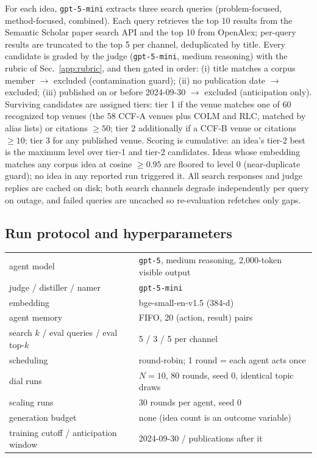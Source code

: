 \documentclass{article} %
\begin{document}
For each idea, \texttt{gpt-5-mini} extracts three search queries
(problem-focused, method-focused, combined). Each query retrieves the
top 10 results from the Semantic Scholar paper search API and the top
10 from OpenAlex; per-query results are truncated to the top 5 per
channel, deduplicated by title. Every candidate is graded by the judge
(\texttt{gpt-5-mini}, medium reasoning) with the rubric of
Sec.~\ref{app:rubric}, and then gated in order: (i) title matches a
corpus member $\to$ excluded (contamination guard); (ii) no publication
date $\to$ excluded; (iii) published on or before 2024-09-30 $\to$
excluded (anticipation only). Surviving candidates are assigned tiers:
tier 1 if the venue matches one of 60 recognized top venues (the 58
CCF-A venues plus COLM and RLC, matched by alias lists) or citations
$\geq 50$; tier 2 additionally if a CCF-B venue or citations $\geq
10$; tier 3 for any published venue. Scoring is cumulative: an idea's
tier-2 best is the maximum level over tier-1 and tier-2 candidates.
Ideas whose embedding matches any corpus idea at cosine $\geq 0.95$
are floored to level 0 (near-duplicate guard); no idea in any reported
run triggered it. All search responses and judge replies are cached on
disk; both search channels degrade independently per query on outage,
and failed queries are uncached so re-evaluation refetches only gaps.

\subsection{Run protocol and hyperparameters}
\label{app:hyper}

\begin{center}\small
\begin{tabular}{ll}
\toprule
agent model & \texttt{gpt-5}, medium reasoning, 2{,}000-token visible output \\
judge / distiller / namer & \texttt{gpt-5-mini} \\
embedding & bge-small-en-v1.5 (384-d) \\
agent memory & FIFO, 20 (action, result) pairs \\
search $k$ / eval queries / eval top-$k$ & 5 / 3 / 5 per channel \\
scheduling & round-robin; 1 round = each agent acts once \\
dial runs & $N{=}10$, 80 rounds, seed 0, identical topic draws \\
scaling runs & 30 rounds per agent, seed 0 \\
generation budget & none (idea count is an outcome variable) \\
training cutoff / anticipation window & 2024-09-30 / publications after it \\
\bottomrule
\end{tabular}
\end{center}
\end{document}
